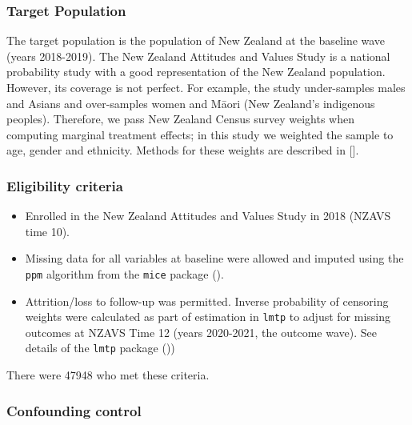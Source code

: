 \documentclass[
  single column]{article}
\providecommand{\tightlist}{%
  \setlength{\itemsep}{0pt}\setlength{\parskip}{0pt}}\usepackage{longtable,booktabs,array}
\begin{document}
\subsubsection{Target Population}\label{target-population}

The target population is the population of New Zealand at the baseline
wave (years 2018-2019). The New Zealand Attitudes and Values Study is a
national probability study with a good representation of the New Zealand
population. However, its coverage is not perfect. For example, the study
under-samples males and Asians and over-samples women and Māori (New
Zealand's indigenous peoples). Therefore, we pass New Zealand Census
survey weights when computing marginal treatment effects; in this study
we weighted the sample to age, gender and ethnicity. Methods for these
weights are described in {[}{]}.

\subsubsection{Eligibility criteria}\label{eligibility-criteria}

\begin{itemize}
\tightlist
\item
  Enrolled in the New Zealand Attitudes and Values Study in 2018 (NZAVS
  time 10).
\item
  Missing data for all variables at baseline were allowed and imputed
  using the \texttt{ppm} algorithm from the \texttt{mice} package
  ().
\item
  Attrition/loss to follow-up was permitted. Inverse probability of
  censoring weights were calculated as part of estimation in
  \texttt{lmtp} to adjust for missing outcomes at NZAVS Time 12 (years
  2020-2021, the outcome wave). See details of the \texttt{lmtp} package
  ())
\end{itemize}

There were 47948 who met these criteria.

\subsubsection{Confounding control}\label{confounding-control}
\end{document}
